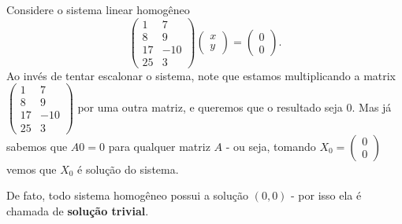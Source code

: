 \begin{ex}
	Considere o sistema linear homogêneo
	\[\begin{pmatrix}
	1&7\\8&9\\17&-10\\25&3
	\end{pmatrix}\begin{pmatrix}
	x\\y
	\end{pmatrix}=\begin{pmatrix}
	0\\0
	\end{pmatrix}.\] Ao invés de tentar escalonar o sistema, note que estamos multiplicando a matrix $\begin{pmatrix}
	1&7\\8&9\\17&-10\\25&3
	\end{pmatrix}$ por uma outra matriz, e queremos que o resultado seja $0$. Mas já sabemos que $A0=0$ para qualquer matriz $A$ - ou seja, tomando $X_0=\begin{pmatrix}
	0\\0
	\end{pmatrix}$ vemos que $X_0$ é solução do sistema.
\end{ex}

De fato, todo sistema homogêneo possui a solução $(0,0)$ - por isso ela é chamada de \textbf{solução trivial}.

